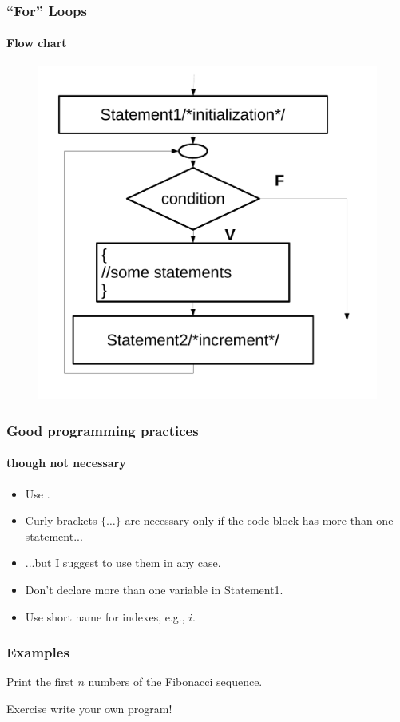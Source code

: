 \documentclass[12pt]{beamer}
\begin{document}
\begin{frame}
\frametitle{``For'' Loops}
\framesubtitle{Flow chart}
\LstForLine
\begin{figure}
    \includegraphics[height=0.7\textheight]{../figures/for_loop}
\end{figure}
\end{frame}


\begin{frame}
  \frametitle{Good programming practices}
  \framesubtitle{though not necessary}
\begin{itemize}
\item  Use .
\item  Curly brackets $\{\ldots\}$ are necessary only if the code block has more than one statement...
\item  ...but I suggest to use them in any case.
\item  Don't declare more than one variable in Statement1.
\item  Use short name for indexes, e.g., $i$.
\end{itemize}
\end{frame}

\begin{frame}
  \frametitle{Examples}
  Print the first $n$ numbers of the Fibonacci sequence.
\LstFibo
  \begin{alertblock}{Exercise}
    write your own program!
  \end{alertblock}
\end{frame}
\end{document}
